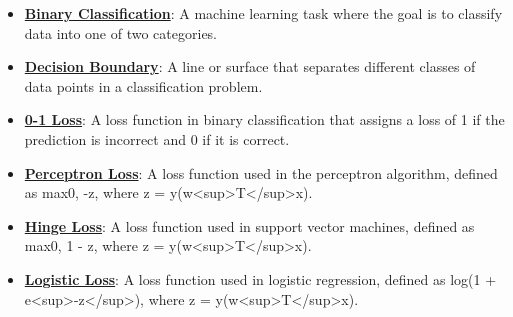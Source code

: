 \documentclass{article}%
\begin{document}
\begin{itemize}[leftmargin=*]
\item \href{https://purdue.brightspace.com/d2l/common/assets/pdfjs-d2l-dist/1.0.14-legacy/web/viewer.html?file=%2Fcontent%2Fenforced%2F1095467-wl.202510.CS.24300.001%2F05L2-ML Basics.pdf%3Fou%3D1095467&lang=en-us&container=d2l-fileviewer-rendered-pdf&fullscreen=d2l-fileviewer-rendered-pdf-dialog&height=667#page=20}{\textbf{Binary Classification}}: A machine learning task where the goal is to classify data into one of two categories.%
\item \href{https://purdue.brightspace.com/d2l/common/assets/pdfjs-d2l-dist/1.0.14-legacy/web/viewer.html?file=%2Fcontent%2Fenforced%2F1095467-wl.202510.CS.24300.001%2F05L2-ML Basics.pdf%3Fou%3D1095467&lang=en-us&container=d2l-fileviewer-rendered-pdf&fullscreen=d2l-fileviewer-rendered-pdf-dialog&height=667#page=24}{\textbf{Decision Boundary}}: A line or surface that separates different classes of data points in a classification problem.%
\item \href{https://purdue.brightspace.com/d2l/common/assets/pdfjs-d2l-dist/1.0.14-legacy/web/viewer.html?file=%2Fcontent%2Fenforced%2F1095467-wl.202510.CS.24300.001%2F05L2-ML Basics.pdf%3Fou%3D1095467&lang=en-us&container=d2l-fileviewer-rendered-pdf&fullscreen=d2l-fileviewer-rendered-pdf-dialog&height=667#page=25}{\textbf{0-1 Loss}}: A loss function in binary classification that assigns a loss of 1 if the prediction is incorrect and 0 if it is correct.%
\item \href{https://purdue.brightspace.com/d2l/common/assets/pdfjs-d2l-dist/1.0.14-legacy/web/viewer.html?file=%2Fcontent%2Fenforced%2F1095467-wl.202510.CS.24300.001%2F05L2-ML Basics.pdf%3Fou%3D1095467&lang=en-us&container=d2l-fileviewer-rendered-pdf&fullscreen=d2l-fileviewer-rendered-pdf-dialog&height=667#page=27}{\textbf{Perceptron Loss}}: A loss function used in the perceptron algorithm, defined as max{0, -z}, where z = y(w<sup>T</sup>x).%
\item \href{https://purdue.brightspace.com/d2l/common/assets/pdfjs-d2l-dist/1.0.14-legacy/web/viewer.html?file=%2Fcontent%2Fenforced%2F1095467-wl.202510.CS.24300.001%2F05L2-ML Basics.pdf%3Fou%3D1095467&lang=en-us&container=d2l-fileviewer-rendered-pdf&fullscreen=d2l-fileviewer-rendered-pdf-dialog&height=667#page=27}{\textbf{Hinge Loss}}: A loss function used in support vector machines, defined as max{0, 1 - z}, where z = y(w<sup>T</sup>x).%
\item \href{https://purdue.brightspace.com/d2l/common/assets/pdfjs-d2l-dist/1.0.14-legacy/web/viewer.html?file=%2Fcontent%2Fenforced%2F1095467-wl.202510.CS.24300.001%2F05L2-ML Basics.pdf%3Fou%3D1095467&lang=en-us&container=d2l-fileviewer-rendered-pdf&fullscreen=d2l-fileviewer-rendered-pdf-dialog&height=667#page=27}{\textbf{Logistic Loss}}: A loss function used in logistic regression, defined as log(1 + e<sup>-z</sup>), where z = y(w<sup>T</sup>x).%

\end{itemize}
\end{document}
